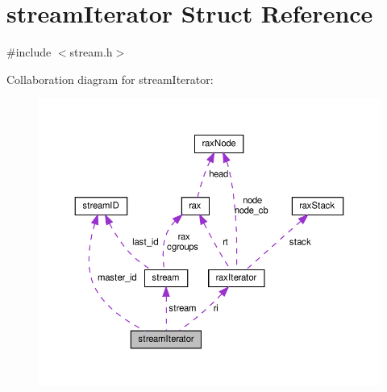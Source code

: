 \hypertarget{structstream_iterator}{}\section{stream\+Iterator Struct Reference}
\label{structstream_iterator}


{\ttfamily \#include $<$stream.\+h$>$}



Collaboration diagram for stream\+Iterator\+:
\nopagebreak
\begin{figure}[H]
\begin{center}
\leavevmode
\includegraphics[width=350pt]{structstream_iterator__coll__graph}
\end{center}
\end{figure}
